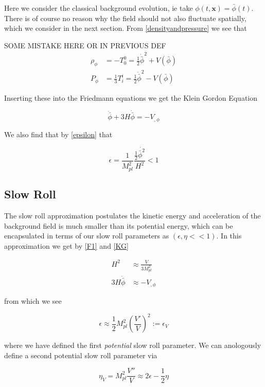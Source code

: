 \documentclass[a4paper,11pt]{article}
\renewcommand{\v}[1]{\mathbf{#1}}
\newcommand{\Mp}{M_{pl}}
\newcommand{\half}{\frac{1}{2}}
\newcommand{\bphi}{\bar{\phi}}
\begin{document}
Here we consider the classical background evolution, ie take $\phi(t,\v{x}) = \bphi(t)$. There is of course no reason why the field should not also fluctuate spatially, which we consider in the next section. From \ref{densityandpressure} we see that 


SOME MISTAKE HERE OR IN PREVIOUS DEF
\begin{align}
\rho_\phi &=-T^0_0 = \half \dot{\bphi}^2+V(\bphi)\\
P_\phi&=\frac{1}{3}T^i_i = \half \dot{\bphi}^2-V(\bphi)
\end{align}

Inserting these into the Friedmann equations we get the Klein Gordon Equation

\begin{equation}
\tag{KG}
\label{KG}
\ddot{\bphi}+3H\dot{\bphi}=-V_{,\phi}
\end{equation}

We also find that by \ref{epsilon} that 

\begin{equation}
\epsilon = \frac{1}{\Mp^2}\frac{\half\dot{\bphi^2}}{H^2} < 1
\end{equation}

\subsection{Slow Roll}

The slow roll approximation postulates the kinetic energy and acceleration of the background field is much smaller than its potential energy, which can be encapsulated in terms of our slow roll parameters as $(\epsilon, \eta << 1)$. In this approximation we get by \ref{F1} and \ref{KG} 

\begin{align}
H^2 &\approx \frac{V}{3\Mp^2} \\
3H\dot{\bphi} &\approx -V_{,\phi}
\end{align}

from which we see 

\begin{equation}
\epsilon \approx \half\Mp^2 (\frac{V'}{V})^2 := \epsilon_V
\end{equation}

where we have defined the first \textit{potential} slow roll parameter. We can anologously define a second potential slow roll parameter via

\begin{equation}
\eta_V = \Mp^2 \frac{V''}{V} \approx 2\epsilon - \half\eta
\end{equation}
\end{document}
